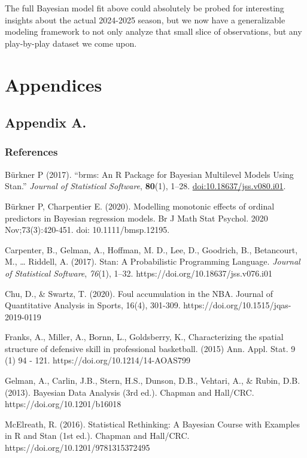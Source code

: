 \documentclass[
  letterpaper,
  DIV=11,
  numbers=noendperiod]{scrartcl}
\begin{document}
The full Bayesian model fit above could absolutely be probed for
interesting insights about the actual 2024-2025 season, but we now have
a generalizable modeling framework to not only analyze that small slice
of observations, but any play-by-play dataset we come upon.

\section{Appendices}\label{appendices}

\subsection{Appendix A.}\label{appendix-a.}

\subsubsection{References}\label{references}

Bürkner P (2017). ``brms: An R Package for Bayesian Multilevel Models
Using Stan.'' \emph{Journal of Statistical Software}, \textbf{80}(1),
1--28.
\href{https://doi.org/10.18637/jss.v080.i01}{doi:10.18637/jss.v080.i01}.

Bürkner P, Charpentier E. (2020). Modelling monotonic effects of ordinal
predictors in Bayesian regression models. Br J Math Stat Psychol. 2020
Nov;73(3):420-451. doi: 10.1111/bmsp.12195.

Carpenter, B., Gelman, A., Hoffman, M. D., Lee, D., Goodrich, B.,
Betancourt, M., \ldots{} Riddell, A. (2017). Stan: A Probabilistic
Programming Language. \emph{Journal of Statistical Software},
\emph{76}(1), 1--32. https://doi.org/10.18637/jss.v076.i01

Chu, D., \& Swartz, T. (2020). Foul accumulation in the NBA. Journal of
Quantitative Analysis in Sports, 16(4), 301-309.
https://doi.org/10.1515/jqas-2019-0119

Franks, A., Miller, A., Bornn, L., Goldsberry, K., Characterizing the
spatial structure of defensive skill in professional basketball. (2015)
Ann. Appl. Stat. 9 (1) 94 - 121. https://doi.org/10.1214/14-AOAS799

Gelman, A., Carlin, J.B., Stern, H.S., Dunson, D.B., Vehtari, A., \&
Rubin, D.B. (2013). Bayesian Data Analysis (3rd ed.). Chapman and
Hall/CRC. https://doi.org/10.1201/b16018

McElreath, R. (2016). Statistical Rethinking: A Bayesian Course with
Examples in R and Stan (1st ed.). Chapman and Hall/CRC.
https://doi.org/10.1201/9781315372495
\end{document}
